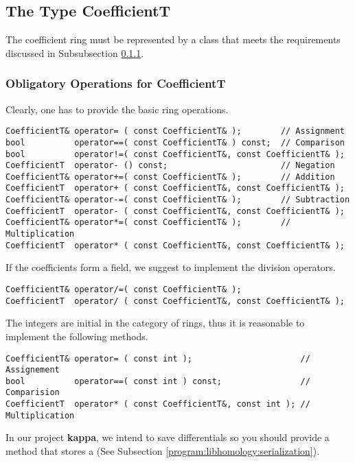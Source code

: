 \subsection{The Type CoefficientT}
\label{program:libhomology:CoefficientT}

The coefficient ring must be represented by a class that meets the requirements discussed in Subsubsection \ref{program:libhomology:CoefficientT:obligatory_reqs}.

\subsubsection{Obligatory Operations for CoefficientT}
\label{program:libhomology:CoefficientT:obligatory_reqs}
Clearly, one has to provide the basic ring operations.
\begin{lstlisting}
CoefficientT& operator= ( const CoefficientT& );        // Assignment
bool          operator==( const CoefficientT& ) const;  // Comparison
bool          operator!=( const CoefficientT&, const CoefficientT& );
CoefficientT  operator- () const;                       // Negation
CoefficientT& operator+=( const CoefficientT& );        // Addition
CoefficientT  operator+ ( const CoefficientT&, const CoefficientT& );
CoefficientT& operator-=( const CoefficientT& );        // Subtraction
CoefficientT  operator- ( const CoefficientT&, const CoefficientT& );
CoefficientT& operator*=( const CoefficientT& );        // Multiplication
CoefficientT  operator* ( const CoefficientT&, const CoefficientT& );
\end{lstlisting}
If the coefficients form a field, we suggest to implement the division operators.
\begin{lstlisting}
CoefficientT& operator/=( const CoefficientT& );
CoefficientT  operator/ ( const CoefficientT&, const CoefficientT& );
\end{lstlisting}

The integers are initial in the category of rings, thus it is reasonable to implement the following methods.
\begin{lstlisting}
CoefficientT& operator= ( const int );                      // Assignement
bool          operator==( const int ) const;                // Comparision
CoefficientT  operator* ( const CoefficientT&, const int ); // Multiplication
\end{lstlisting}

In our project {\bf kappa}, we intend to save differentials so you should provide a method that stores a  (See Subsection \ref{program:libhomology:serialization}).

